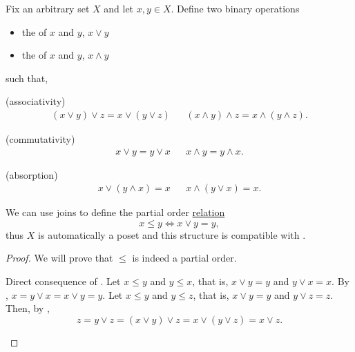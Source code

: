 \begin{definition}\label{def:binary_join_meet}
  Fix an arbitrary set \( X \) and let \( x, y \in X \). Define two binary operations
  \begin{itemize}
    \item the  of \( x \) and \( y \), \( x \vee y \)
    \item the  of \( x \) and \( y \), \( x \wedge y \)
  \end{itemize}
  such that,
  \begin{defenum}
    (associativity)
    \begin{align*}
      (x \vee y) \vee z = x \vee (y \vee z)
      &&
      (x \wedge y) \wedge z = x \wedge (y \wedge z).
    \end{align*}

    (commutativity)
    \begin{align*}
      x \vee y = y \vee x
      &&
      x \wedge y = y \wedge x.
    \end{align*}

    (absorption)
    \begin{align*}
      x \vee (y \wedge x) = x
      &&
      x \wedge (y \vee x) = x.
    \end{align*}
  \end{defenum}

  We can use joins to define the partial order \hyperref[def:poset]{relation}
  \begin{equation*}
    x \leq y \iff x \vee y = y,
  \end{equation*}
  thus \( X \) is automatically a poset and this structure is compatible with .
\end{definition}
\begin{proof}
  We will prove that \( \leq \) is indeed a partial order.
  \begin{description}
     Direct consequence of .
     Let \( x \leq y \) and \( y \leq x \), that is, \( x \vee y = y \) and \( y \vee x = x \). By , \( x = y \vee x = x \vee y = y \).
     Let \( x \leq y \) and \( y \leq z \), that is, \( x \vee y = y \) and \( y \vee z = z \). Then, by ,
    \begin{equation*}
      z = y \vee z = (x \vee y) \vee z = x \vee (y \vee z) = x \vee z.
    \end{equation*}
  \end{description}
\end{proof}

